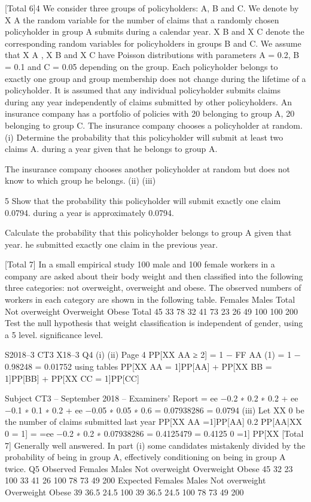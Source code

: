 [Total 6]4
We consider three groups of policyholders: A, B and C. We denote by X A the random
variable for the number of claims that a randomly chosen policyholder in group A
submits during a calendar year. X B and X C denote the corresponding random variables
for policyholders in groups B and C. We assume that X A , X B and X C have Poisson
distributions with parameters \lambda A = 0.2, \lambda B = 0.1 and \lambda C = 0.05 depending on the
group. Each policyholder belongs to exactly one group and group membership does
not change during the lifetime of a policyholder. It is assumed that any individual
policyholder submits claims during any year independently of claims submitted by
other policyholders.
An insurance company has a portfolio of policies with 20%
belonging to group A, 20%
belonging to group C.
The insurance company chooses a policyholder at random.
(i)
Determine the probability that this policyholder will submit at least two claims
A.
during a year given that he belongs to group A.

The insurance company chooses another policyholder at random but does not know to
which group he belongs.
(ii)
(iii)

5
Show that the probability this policyholder will submit exactly one claim
0.0794.
during a year is approximately 0.0794.

Calculate the probability that this policyholder belongs to group A given that
year.
he submitted exactly one claim in the previous year.

[Total 7]
In a small empirical study 100 male and 100 female workers in a company are asked
about their body weight and then classified into the following three categories:
not overweight, overweight and obese. The observed numbers of workers in each
category are shown in the following table.
Females
Males
Total
Not overweight Overweight Obese Total
45
33
78 32
41
73 23
26
49 100
100
200
Test the null hypothesis that weight classification is independent of gender, using a 5%
level.
significance level.

S2018–3 
CT3 X18–3
Q4
(i)
(ii)
Page 4
PP[XX AA ≥ 2] = 1 − FF AA (1) = 1 − 0.98248 = 0.01752 using tables
PP[XX AA = 1]PP[AA] + PP[XX BB = 1]PP[BB] + PP[XX CC = 1]PP[CC]

Subject CT3  – September 2018 – Examiners’ Report
= ee −0.2 ∗ 0.2 ∗ 0.2 + ee −0.1 ∗ 0.1 ∗ 0.2 + ee −0.05 ∗ 0.05 ∗ 0.6 = 0.07938286 = 0.0794 
(iii)
Let XX 0 be the number of claims submitted last year
PP[XX AA =1]PP[AA]
0.2
PP[AA|XX 0 = 1] =
=ee −0.2 ∗ 0.2 ∗ 0.07938286 = 0.4125479 = 0.4125 
0 =1]
PP[XX
[Total 7]
Generally well answered. In part (i) some candidates mistakenly
divided by the probability of being in group A, effectively conditioning
on being in group A twice.
Q5
Observed
Females
Males
Not overweight Overweight Obese
45
32
23 100
33
41
26 100
78
73
49 200
Expected
Females
Males
Not overweight Overweight Obese
39
36.5
24.5 100
39
36.5
24.5 100
78
73
49 200

